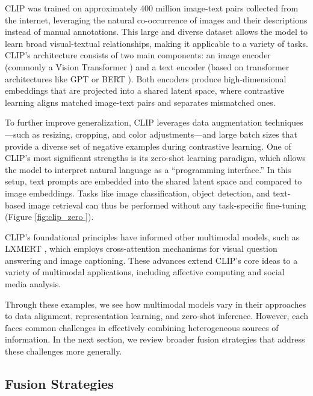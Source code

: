 CLIP was trained on approximately 400 million image-text pairs collected from the internet, leveraging the natural co-occurrence of images and their descriptions instead of manual annotations. This large and diverse dataset allows the model to learn broad visual-textual relationships, making it applicable to a variety of tasks. CLIP’s architecture consists of two main components: an image encoder (commonly a Vision Transformer \cite{dosovitskiy2021imageworth16x16words}) and a text encoder (based on transformer architectures like GPT or BERT \cite{Radford2018ImprovingLU, DBLP:journals/corr/abs-1810-04805}). Both encoders produce high-dimensional embeddings that are projected into a shared latent space, where contrastive learning aligns matched image-text pairs and separates mismatched ones.
\newline

To further improve generalization, CLIP leverages data augmentation techniques—such as resizing, cropping, and color adjustments—and large batch sizes that provide a diverse set of negative examples during contrastive learning. One of CLIP’s most significant strengths is its zero-shot learning paradigm, which allows the model to interpret natural language as a “programming interface.” In this setup, text prompts are embedded into the shared latent space and compared to image embeddings. Tasks like image classification, object detection, and text-based image retrieval can thus be performed without any task-specific fine-tuning (Figure \ref{fig:clip_zero }).
\newline

CLIP’s foundational principles have informed other multimodal models, such as LXMERT \cite{tan2019lxmertlearningcrossmodalityencoder}, which employs cross-attention mechanisms for visual question answering and image captioning. These advances extend CLIP’s core ideas to a variety of multimodal applications, including affective computing and social media analysis.
\newline

Through these examples, we see how multimodal models vary in their approaches to data alignment, representation learning, and zero-shot inference. However, each faces common challenges in effectively combining heterogeneous sources of information. In the next section, we review broader fusion strategies that address these challenges more generally.

\subsection{Fusion Strategies}

